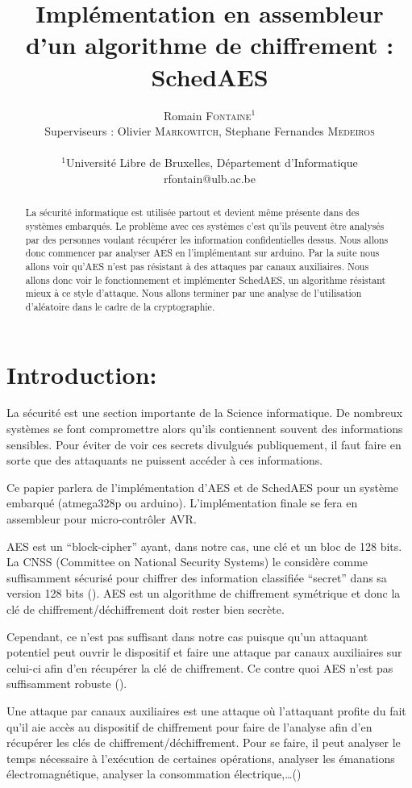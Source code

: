 \documentclass[letterpaper]{article}
\author{Romain \textsc{Fontaine}$^{1}$\\
    Superviseurs : Olivier \textsc{Markowitch}, Stephane Fernandes \textsc{Medeiros}\\
    \mbox{}\\
    $^1$Université Libre de Bruxelles, Département d’Informatique \\
    rfontain@ulb.ac.be
}
\title{Implémentation en assembleur d'un algorithme de chiffrement :\\ SchedAES}
\date{}
\begin{document}
\maketitle

\begin{abstract}
    La sécurité informatique est utilisée partout et devient même présente dans des systèmes embarqués.
    Le problème avec ces systèmes c'est qu'ils peuvent être analysés par des personnes voulant récupérer les information confidentielles dessus.
    Nous allons donc commencer par analyser AES en l'implémentant sur arduino.
    Par la suite nous allons voir qu'AES n'est pas résistant à des attaques par canaux auxiliaires.
    Nous allons donc voir le fonctionnement et implémenter SchedAES, un algorithme résistant mieux à ce style d'attaque.
    Nous allons terminer par une analyse de l'utilisation d'aléatoire dans le cadre de la cryptographie.
\end{abstract}

\section{Introduction:}
La sécurité est une section importante de la Science informatique. De nombreux systèmes se font compromettre alors qu'ils contiennent souvent des informations sensibles. Pour éviter de voir ces secrets divulgués publiquement, il faut faire en sorte que des attaquants ne puissent accéder à ces informations.

Ce papier parlera de l'implémentation d'AES et de SchedAES pour un système embarqué (atmega328p ou arduino). L'implémentation finale se fera en assembleur pour micro-contrôler AVR.

AES est un ``block-cipher'' ayant, dans notre cas, une clé et un bloc de 128 bits.
La CNSS (Committee on National Security Systems) le considère comme suffisamment sécurisé pour chiffrer des information classifiée ``secret'' dans sa version 128 bits (\cite{policy2003no}).
AES est un algorithme de chiffrement symétrique et donc la clé de chiffrement/déchiffrement doit rester bien secrète.

Cependant, ce n'est pas suffisant dans notre cas puisque qu'un attaquant potentiel peut ouvrir le dispositif et faire une attaque par canaux auxiliaires sur celui-ci afin d'en récupérer la clé de chiffrement. Ce contre quoi AES n'est pas suffisamment robuste (\cite{Renauld2009}).

Une attaque par canaux auxiliaires est une attaque où l'attaquant profite du fait qu'il aie accès au dispositif de chiffrement pour faire de l'analyse afin d'en récupérer les clés de chiffrement/déchiffrement.
Pour se faire, il peut analyser le temps nécessaire à l'exécution de certaines opérations, analyser les émanations électromagnétique, analyser la consommation électrique,\ldots(\cite{zhou2005side})
\end{document}
